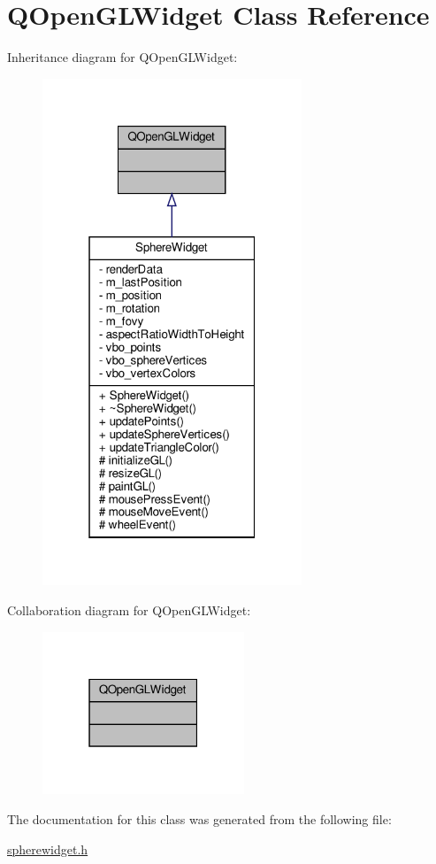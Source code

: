 \hypertarget{class_q_open_g_l_widget}{}\section{Q\+Open\+G\+L\+Widget Class Reference}
\label{class_q_open_g_l_widget}


Inheritance diagram for Q\+Open\+G\+L\+Widget\+:
\nopagebreak
\begin{figure}[H]
\begin{center}
\leavevmode
\includegraphics[width=220pt]{d3/dd5/class_q_open_g_l_widget__inherit__graph}
\end{center}
\end{figure}


Collaboration diagram for Q\+Open\+G\+L\+Widget\+:
\nopagebreak
\begin{figure}[H]
\begin{center}
\leavevmode
\includegraphics[width=171pt]{d8/d61/class_q_open_g_l_widget__coll__graph}
\end{center}
\end{figure}


The documentation for this class was generated from the following file\+:\begin{DoxyCompactItemize}
\item 
\hyperlink{spherewidget_8h}{spherewidget.\+h}\end{DoxyCompactItemize}
